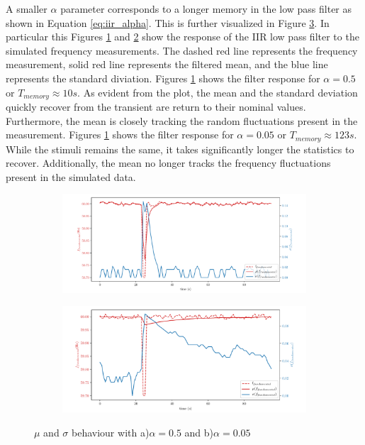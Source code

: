 A smaller $\alpha$ parameter corresponds to a longer memory in the low pass filter as shown in Equation \ref{eq:iir_alpha}.
This is further visualized in Figure \ref{fig:expdes:5}.
In particular this Figures \ref{fig:expdes:5:1} and \ref{fig:expdes:5:2} show the response of the IIR low pass filter to the simulated frequency measurements.
The dashed red line represents the frequency measurement, solid red line represents the filtered mean, and the blue line represents the standard diviation.
Figures \ref{fig:expdes:5:1} shows the filter response for $\alpha = 0.5$ or $T_{memory} \approx 10s $.
As evident from the plot, the mean and the standard deviation quickly recover from the transient are return to their nominal values.
Furthermore, the mean is closely tracking the random fluctuations present in the measurement.
Figures \ref{fig:expdes:5:1} shows the filter response for $\alpha = 0.05$ or $T_{memory} \approx 123s $.
While the stimuli remains the same, it takes significantly longer the statistics to recover.
Additionally, the mean no longer tracks the frequency fluctuations present in the simulated data.

\begin{figure}[h]
    \centering
    \begin{subfigure}{0.9\textwidth}
        \centering
        \includegraphics[width=1\linewidth]{img/napali_eval/Napali_response_freq_05.pdf}
        \caption{}
        \label{fig:expdes:5:1}
    \end{subfigure}%

    \begin{subfigure}{0.9\textwidth}
        \centering
        \includegraphics[width=1\linewidth]{img/napali_eval/Napali_response_freq_005.pdf}
        \caption{}
        \label{fig:expdes:5:2}
    \end{subfigure}
    \caption{$\mu$ and $\sigma$ behaviour with a)$\alpha = 0.5$ and b)$\alpha=0.05$}
    \label{fig:expdes:5}
\end{figure}

